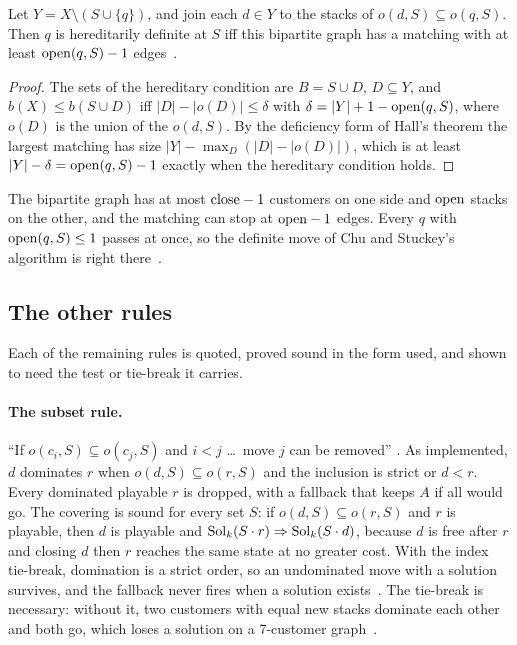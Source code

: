 \begin{theorem}\label{thm:matching}
Let $Y=X\setminus(S\cup\{q\})$, and join each $d\in Y$ to the stacks of
$o(d,S)\subseteq o(q,S)$. Then $q$ is hereditarily definite at $S$ iff this
bipartite graph has a matching with at least $\mathrm{open}(q,S)-1$ edges~.
\end{theorem}
\begin{proof}
The sets of the hereditary condition are $B=S\cup D$, $D\subseteq Y$, and
$b(X)\le b(S\cup D)$ iff $|D|-|o(D)|\le\delta$ with
$\delta=|Y|+1-\mathrm{open}(q,S)$, where $o(D)$ is the union of the $o(d,S)$. By the
deficiency form of Hall's theorem the largest matching has size
$|Y|-\max_D(|D|-|o(D)|)$, which is at least $|Y|-\delta=\mathrm{open}(q,S)-1$ exactly
when the hereditary condition holds.
\end{proof}

The bipartite graph has at most $\mathrm{close}-1$ customers on one side and $\mathrm{open}$
stacks on the other, and the matching can stop at $\mathrm{open}-1$ edges. Every $q$
with $\mathrm{open}(q,S)\le1$ passes at once, so the definite move of Chu and Stuckey's algorithm is right
there~.

\subsection{The other rules}
\label{sec:other-rules}

Each of the remaining rules is quoted, proved sound in the form used, and
shown to need the test or tie-break it carries.

\paragraph{The subset rule.} ``If $o(c_i,S)\subseteq o(c_j,S)$ and $i<j$ \dots\
move $j$ can be removed'' \citep[\S2, p.~5]{ChuStuckey2009}. As implemented,
$d$ dominates $r$ when $o(d,S)\subseteq o(r,S)$ and the inclusion is strict or
$d<r$. Every dominated playable $r$ is dropped, with a fallback that keeps $A$
if all would go. The covering is sound for every set $S$: if
$o(d,S)\subseteq o(r,S)$ and $r$ is playable, then $d$ is playable and
$\mathrm{Sol}_k(S\cdot r)\Rightarrow \mathrm{Sol}_k(S\cdot d)$, because $d$ is free after $r$
and closing $d$ then $r$ reaches the same state at no greater cost. With the
index tie-break, domination is a strict order, so an undominated move with a
solution survives, and the fallback never fires when a solution
exists~. The tie-break is necessary: without it, two customers
with equal new stacks dominate each other and both go, which loses a solution
on a 7-customer graph~\leanref{tiebreak}.

